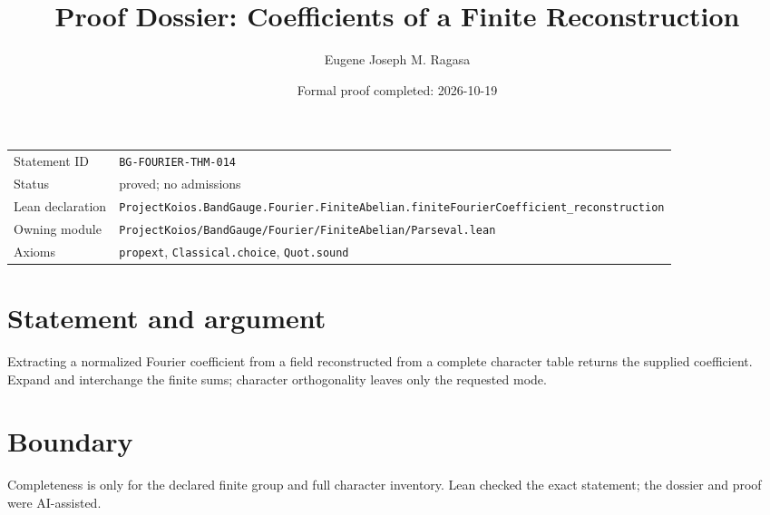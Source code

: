 \documentclass[11pt]{article}
\title{Proof Dossier: Coefficients of a Finite Reconstruction}
\author{Eugene Joseph M. Ragasa}
\date{Formal proof completed: 2026-10-19}
\begin{document}
\maketitle
\noindent\begin{tabularx}{\textwidth}{@{}lX@{}}\toprule
Statement ID & \texttt{BG-FOURIER-THM-014} \\
Status & proved; no admissions \\
Lean declaration & \texttt{ProjectKoios.BandGauge.Fourier.FiniteAbelian.}\newline\texttt{finiteFourierCoefficient\_reconstruction} \\
Owning module & \texttt{ProjectKoios/BandGauge/Fourier/FiniteAbelian/Parseval.lean} \\
Axioms & \texttt{propext}, \texttt{Classical.choice}, \texttt{Quot.sound} \\
\bottomrule\end{tabularx}
\section{Statement and argument}
Extracting a normalized Fourier coefficient from a field reconstructed from a complete character table returns the supplied coefficient. Expand and interchange the finite sums; character orthogonality leaves only the requested mode.
\section{Boundary}
Completeness is only for the declared finite group and full character inventory. Lean checked the exact statement; the dossier and proof were AI-assisted.
\end{document}
